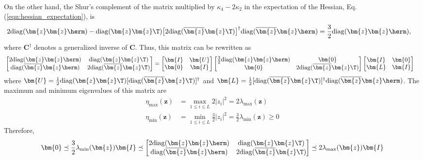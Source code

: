 On the other hand, the Shur's complement of the matrix multiplied by $\kappa_4-2\kappa_2$ in the expectation of the Hessian, Eq.(\ref{eqn:hessian_expectation}), is
\begin{align}
&2\mathrm{diag}(\bm{z}\bm{z}\herm)-\mathrm{diag}(\bm{z}\bm{z}\T)\big[2\mathrm{diag}(\overline{\bm{z}}\bm{z}\T)\big]^{\dagger}\mathrm{diag}(\overline{\bm{z}}\bm{z}\herm)=\frac{3}{2}\mathrm{diag}(\bm{z}\bm{z}\herm),
\end{align}
where $\bm{C}^{\dagger}$ denotes a generalized inverse of $\bm{C}$. Thus, this matrix can be rewritten as
\begin{align}
&\begin{bmatrix}
2\mathrm{diag}(\bm{z}\bm{z}\herm)&\mathrm{diag}(\bm{z}\bm{z}\T)\\
\mathrm{diag}(\overline{\bm{z}}\bm{z}\herm)&2\mathrm{diag}(\overline{\bm{z}}\bm{z}\T)
\end{bmatrix}= \begin{bmatrix}
\bm{I}&\bm{U}\\
\bm{0}&\bm{I}
\end{bmatrix}
\begin{bmatrix}
\frac{3}{2}\mathrm{diag}({\bm{z}}\bm{z}\herm)&\bm{0}\\
\bm{0}&2\mathrm{diag}(\overline{\bm{z}}\bm{z}\T)
\end{bmatrix}\begin{bmatrix}
\bm{I}&\bm{0}\\
\bm{L}&\bm{I}
\end{bmatrix}
\end{align}
where $\bm{U}=\frac{1}{2} \mathrm{diag}({\bm{z}}\bm{z}\T)[\mathrm{diag}(\overline{\bm{z}}\bm{z}\T)]^{\dagger}$ and $\bm{L}=\frac{1}{2}[\mathrm{diag}(\overline{\bm{z}}\bm{z}\T)]^{\dagger}\mathrm{diag}(\overline{\bm{z}}\bm{z}\herm)$. The maximum and minimum eigenvalues of this matrix are
\begin{align}
\eta_{\mathrm{max}}(\bm{z})&=\max_{1\leq i\leq L}2|z_i|^2=2\lambda_{\mathrm{max}}(\bm{z})\\
\eta_{\mathrm{min}}(\bm{z})&=\min_{1\leq i\leq L}\frac{3}{2}|z_i|^2=\frac{3}{2}\lambda_{\mathrm{min}}(\bm{z})\geq0
\end{align}
Therefore,
\begin{align}
\bm{0}\preceq \frac{3}{2}\lambda_{\mathrm{min}}(\bm{z})\bm{I}\preceq\begin{bmatrix}
2\mathrm{diag}(\bm{z}\bm{z}\herm)&\mathrm{diag}(\bm{z}\bm{z}\T)\\
\mathrm{diag}(\overline{\bm{z}}\bm{z}\herm)&2\mathrm{diag}(\overline{\bm{z}}\bm{z}\T)
\end{bmatrix} \preceq 2\lambda_{\mathrm{max}}(\bm{z})\bm{I}
\end{align}

